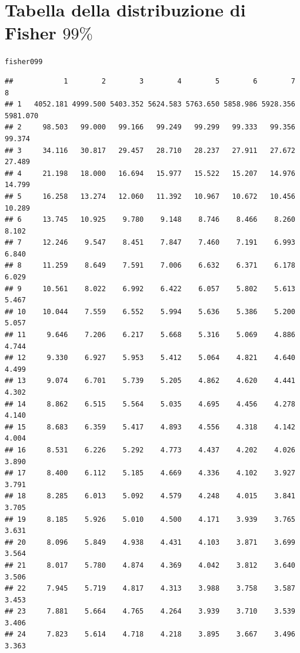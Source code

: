 \documentclass[onecolumn,12pt]{book}\usepackage[]{graphicx}\usepackage[]{color}
\makeatletter
\newcommand{\hlstd}[1]{\textcolor[rgb]{0.345,0.345,0.345}{#1}}%
\newenvironment{kframe}{%
 \def\at@end@of@kframe{}%
 \ifinner\ifhmode%
  \def\at@end@of@kframe{\end{minipage}}%
  \begin{minipage}{\columnwidth}%
 \fi\fi%
 \def\FrameCommand##1{\hskip\@totalleftmargin \hskip-\fboxsep
 \colorbox{shadecolor}{##1}\hskip-\fboxsep
     \hskip-\linewidth \hskip-\@totalleftmargin \hskip\columnwidth}%
 \MakeFramed {\advance\hsize-\width
   \@totalleftmargin\z@ \linewidth\hsize
   \@setminipage}}%
 {\par\unskip\endMakeFramed%
 \at@end@of@kframe}
\newenvironment{knitrout}{}{} %
\makeatother
\begin{document}
\section*{Tabella della distribuzione di Fisher $99\%$}
\oddsidemargin 0.0in
\evensidemargin 0.0in
\topmargin -0.4in
\begin{knitrout}
\color{fgcolor}\begin{kframe}
\begin{alltt}
\hlstd{fisher099}
\end{alltt}
\begin{verbatim}
##            1        2        3        4        5        6        7        8
## 1   4052.181 4999.500 5403.352 5624.583 5763.650 5858.986 5928.356 5981.070
## 2     98.503   99.000   99.166   99.249   99.299   99.333   99.356   99.374
## 3     34.116   30.817   29.457   28.710   28.237   27.911   27.672   27.489
## 4     21.198   18.000   16.694   15.977   15.522   15.207   14.976   14.799
## 5     16.258   13.274   12.060   11.392   10.967   10.672   10.456   10.289
## 6     13.745   10.925    9.780    9.148    8.746    8.466    8.260    8.102
## 7     12.246    9.547    8.451    7.847    7.460    7.191    6.993    6.840
## 8     11.259    8.649    7.591    7.006    6.632    6.371    6.178    6.029
## 9     10.561    8.022    6.992    6.422    6.057    5.802    5.613    5.467
## 10    10.044    7.559    6.552    5.994    5.636    5.386    5.200    5.057
## 11     9.646    7.206    6.217    5.668    5.316    5.069    4.886    4.744
## 12     9.330    6.927    5.953    5.412    5.064    4.821    4.640    4.499
## 13     9.074    6.701    5.739    5.205    4.862    4.620    4.441    4.302
## 14     8.862    6.515    5.564    5.035    4.695    4.456    4.278    4.140
## 15     8.683    6.359    5.417    4.893    4.556    4.318    4.142    4.004
## 16     8.531    6.226    5.292    4.773    4.437    4.202    4.026    3.890
## 17     8.400    6.112    5.185    4.669    4.336    4.102    3.927    3.791
## 18     8.285    6.013    5.092    4.579    4.248    4.015    3.841    3.705
## 19     8.185    5.926    5.010    4.500    4.171    3.939    3.765    3.631
## 20     8.096    5.849    4.938    4.431    4.103    3.871    3.699    3.564
## 21     8.017    5.780    4.874    4.369    4.042    3.812    3.640    3.506
## 22     7.945    5.719    4.817    4.313    3.988    3.758    3.587    3.453
## 23     7.881    5.664    4.765    4.264    3.939    3.710    3.539    3.406
## 24     7.823    5.614    4.718    4.218    3.895    3.667    3.496    3.363

\end{verbatim}
\end{kframe}
\end{knitrout}
\end{document}

